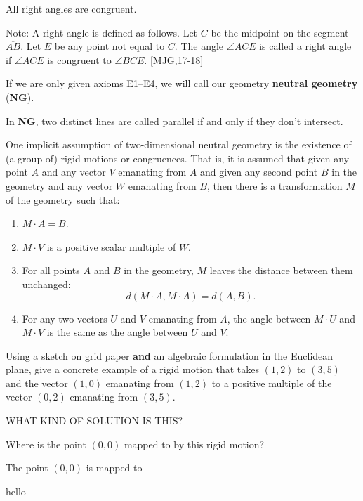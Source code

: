 \documentclass{ximera}
\begin{document}
\begin{axiom}[E4]
All right angles are congruent. 

Note: A right angle is defined as follows. Let $C$ be the midpoint on
the segment $\overline{AB}$. Let $E$ be any point not equal to
$C$. The angle $\angle ACE$ is called a right angle if $\angle ACE$ is
congruent to $\angle BCE$. [MJG,17-18]
\end{axiom}

\begin{definition}
If we are only given axioms E1--E4, we will call our
geometry \textbf{neutral geometry} (\textbf{NG}).
\end{definition}

\begin{definition}
In \textbf{NG}, two distinct lines are called parallel if and only if they
don't intersect.
\end{definition}

One implicit assumption of two-dimensional neutral geometry is the
existence of (a group of) rigid motions or congruences. That is, it is
assumed that given any point $A$ and any vector
$V$ emanating from $A$ and given any second point
$B$ in the geometry and any vector $W$ emanating
from $B$, then there is a transformation $M$ of the
geometry such that:
\begin{enumerate}
\item $M\cdot A=B$.
\item $M\cdot V$ is a positive scalar multiple of $W$.
\item For all points $A$ and $B$ in the geometry,
  $M$ leaves the distance between them unchanged:
\[
d\left(M\cdot A,  M\cdot A\right) =d\left( A,B\right).
\]
\item For any two vectors $U$ and $V$ emanating from
  $A$, the angle between $M\cdot U$ and
  $M\cdot V$ is the same as the angle between $U$
  and $V$.
\end{enumerate}


\begin{exercise}
Using a sketch on grid paper \textbf{and} an algebraic formulation in
the Euclidean plane, give a concrete example of a rigid motion that
takes $\left( 1,2\right) $ to $\left( 3,5\right) $ and the vector
$\left( 1,0\right) $ emanating from $\left( 1,2\right) $ to a positive
multiple of the vector $\left( 0,2\right) $ emanating from $\left(
3,5\right)$. 
\begin{solution}
WHAT KIND OF SOLUTION IS THIS?
\end{solution}
Where is the point $(0,0)$ mapped to by this rigid
motion?
\begin{solution}
The point $(0,0)$ is mapped to 
\begin{matrixanswer}[hello]
hello
\end{matrixanswer}
\end{solution}
\end{exercise}
\end{document}
